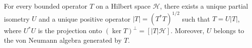 For every bounded operator $T$ on a Hilbert space $\mathcal{H}$, there exists a unique partial isometry $U$ and a unique positive operator $|T| = (T^*T)^{1/2}$ such that $T = U|T|$, where $U^*U$ is the projection onto $(\ker T)^\perp = [|T|\mathcal{H}]$. Moreover, $U$ belongs to the von Neumann algebra generated by $T$.
